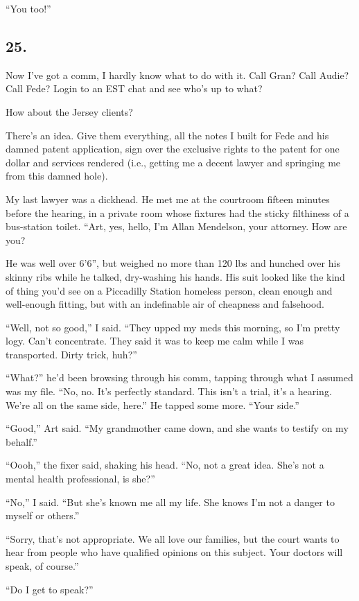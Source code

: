 “You too!”

\subsection{25.}

Now I’ve got a comm, I hardly know what to do with it. Call Gran?
Call Audie? Call Fede? Login to an EST chat and see who’s up to
what?

How about the Jersey clients?

There’s an idea. Give them everything, all the notes I built for
Fede and his damned patent application, sign over the exclusive
rights to the patent for one dollar and services rendered (i.e.,
getting me a decent lawyer and springing me from this damned
hole).

My last lawyer was a dickhead. He met me at the courtroom fifteen
minutes before the hearing, in a private room whose fixtures had
the sticky filthiness of a bus-station toilet. “Art, yes, hello,
I’m Allan Mendelson, your attorney. How are you?

He was well over 6’6”, but weighed no more than 120 lbs and hunched
over his skinny ribs while he talked, dry-washing his hands. His
suit looked like the kind of thing you’d see on a Piccadilly
Station homeless person, clean enough and well-enough fitting, but
with an indefinable air of cheapness and falsehood.

“Well, not so good,” I said. “They upped my meds this morning, so
I’m pretty logy. Can’t concentrate. They said it was to keep me
calm while I was transported. Dirty trick, huh?”

“What?” he’d been browsing through his comm, tapping through what I
assumed was my file. “No, no. It’s perfectly standard. This isn’t a
trial, it’s a hearing. We’re all on the same side, here.” He tapped
some more. “Your side.”

“Good,” Art said. “My grandmother came down, and she wants to
testify on my behalf.”

“Oooh,” the fixer said, shaking his head. “No, not a great idea.
She’s not a mental health professional, is she?”

“No,” I said. “But she’s known me all my life. She knows I’m not a
danger to myself or others.”

“Sorry, that’s not appropriate. We all love our families, but the
court wants to hear from people who have qualified opinions on this
subject. Your doctors will speak, of course.”

“Do I get to speak?”

